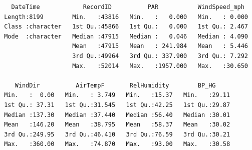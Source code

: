 \documentclass[
  letterpaper,
]{book}
\begin{document}
\begin{verbatim}
   DateTime            RecordID          PAR           WindSpeed_mph   
 Length:8199        Min.   :43816   Min.   :   0.000   Min.   : 0.000  
 Class :character   1st Qu.:45866   1st Qu.:   0.000   1st Qu.: 2.467  
 Mode  :character   Median :47915   Median :   0.046   Median : 4.090  
                    Mean   :47915   Mean   : 241.984   Mean   : 5.446  
                    3rd Qu.:49964   3rd Qu.: 337.900   3rd Qu.: 7.292  
                    Max.   :52014   Max.   :1957.000   Max.   :30.650  
                                                                       
    WindDir          AirTempF       RelHumidity        BP_HG      
 Min.   :  0.00   Min.   : 3.749   Min.   :15.37   Min.   :29.11  
 1st Qu.: 37.31   1st Qu.:31.545   1st Qu.:42.25   1st Qu.:29.87  
 Median :137.30   Median :37.440   Median :56.40   Median :30.01  
 Mean   :146.20   Mean   :38.795   Mean   :58.37   Mean   :30.02  
 3rd Qu.:249.95   3rd Qu.:46.410   3rd Qu.:76.59   3rd Qu.:30.21  
 Max.   :360.00   Max.   :74.870   Max.   :93.00   Max.   :30.58  
                                                                  

\end{verbatim}
\end{document}
